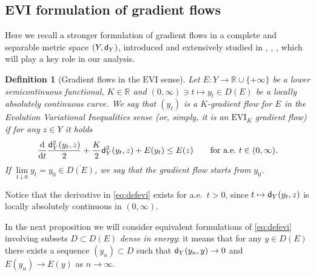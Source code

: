 \documentclass[reqno,11pt]{article}
\numberwithin{equation}{section}
\newcommand{\R}{\mathbb{R}}
\newcommand{\sfd}{{\sf d}}
\renewcommand{\d}{{\mathrm d}}
\newcommand{\EVI}[4]{\mathrm{EVI}_{#4}(#1,{#2}_W,#3)}
\newtheorem{definition}[theorem]{Definition}
\renewcommand{\EVI}{\ensuremath{\mathrm{EVI}}}
\begin{document}
\subsection{EVI formulation of gradient flows}\label{sec:EVI}

Here we recall a stronger formulation of gradient flows in a
complete and separable metric space $(Y,\sfd_Y)$, introduced and
extensively studied in \cite{Ambrosio-Gigli-Savare08},
\cite{Daneri-Savare08}, \cite{Savare10}, which will play a key role
in our analysis.
%
\begin{definition}[Gradient flows in the $\EVI$ sense]\label{def:EVIK}
Let $E:Y\to\R\cup\{+\infty\}$ be a lower semicontinuous functional,
$K\in\R$ and $(0,\infty)\ni t\mapsto y_t\in D(E)$ be a locally
absolutely continuous curve. We say that $(y_t)$ is a $K$-gradient
flow for $E$ in the Evolution Variational Inequalities sense (or,
simply, it is an $\EVI_K$ gradient flow) if for any $z\in Y$ it
holds
\begin{equation}
\label{eq:defevi} \frac \d{\d t}\frac{\sfd_Y^2(y_t,z)}2+\frac
K2\sfd_Y^2(y_t,z)+E(y_t)\leq E(z)\qquad\text{for a.e.~$t\in
(0,\infty)$.}
\end{equation}
If $\lim\limits_{t\downarrow 0}y_t=y_0 \in \overline {D(E)}$, we say
that the gradient flow starts from $y_0$.
\end{definition}
%
Notice that the derivative in \eqref{eq:defevi} exists for
a.e.~$t>0$, since $t\mapsto\sfd_Y(y_t,z)$ is locally absolutely
continuous in $(0,\infty)$.

In the next proposition we will consider equivalent formulations of
\eqref{eq:defevi} involving subsets $D\subset D(E)$ \emph{dense in
energy}: it means that for any $y\in D(E)$ there exists a sequence
$(y_n)\subset D$ such that $\sfd_Y(y_n,y)\to 0$ and $E(y_n)\to E(y)$
as $n\to\infty$.
\end{document}

